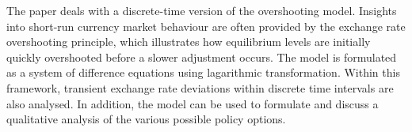 
\begin{Abstrakt}
    The paper deals with a discrete-time version of the overshooting model. Insights into short-run currency market behaviour are often provided by the exchange rate overshooting principle, which illustrates how equilibrium levels are initially quickly overshooted before a slower adjustment occurs. The model is formulated as a system of difference equations using lagarithmic transformation. Within this framework, transient exchange rate deviations within discrete time intervals are also analysed. In addition, the model can be used to formulate and discuss a qualitative analysis of the various possible policy options.
\end{Abstrakt}



\clearpage
